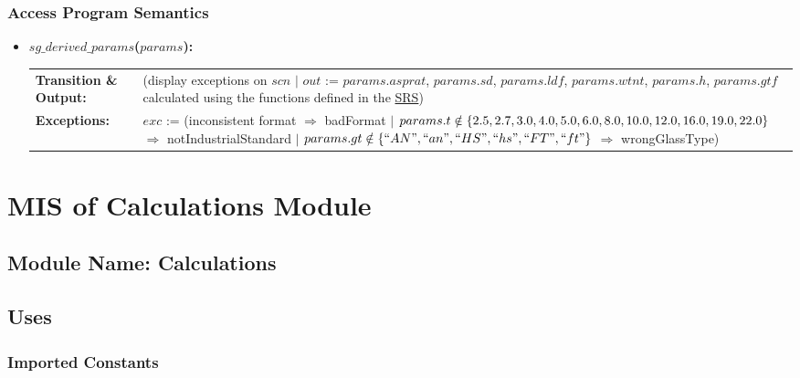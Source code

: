 \documentclass[12pt]{article}
\begin{document}
\subsubsection{Access Program Semantics}

\begin{itemize}
\item\textbf{$sg\_derived\_params$($params$):}  \\ \newline
\begin{tabular}{p{2.5cm} p{}}
\textbf{Transition \newline \& Output:} & (display exceptions on $scn$ \newline $|$ 
$out$ := $params.asprat$, $params.sd$, $params.ldf$, $params.wtnt$, $params.h$, $params.gtf$ calculated using 
the functions defined in the \href{../SRS/glassbr_srs.pdf}{SRS}) \\
\textbf{Exceptions:} & $exc$ := \newline
(inconsistent format $\Rightarrow$ badFormat \newline 
$|$ $params.t \notin \{2.5, 2.7, 3.0, 4.0, 5.0, 6.0, 8.0, 10.0, 12.0, \newline16.0, 19.0, 22.0\}$ $\Rightarrow$ notIndustrialStandard
\newline $|$ $params.gt \notin \{``AN", ``an", ``HS", ``hs", ``FT", ``ft"\}$ $\Rightarrow$ wrongGlassType)\\
\end{tabular}
\end{itemize}


\section{MIS of Calculations Module} \label{SecCalc}

\subsection{Module Name: Calculations}

\subsection{Uses}

\subsubsection{Imported Constants}
\end{document}
